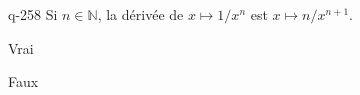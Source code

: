 \begin{truefalse}{q-258}
Si $n \in \mathbb N$, la dérivée de $x\mapsto 1/x^n$ est $x\mapsto n/x^{n+1}$.
\item Vrai
\item* Faux
\end{truefalse}

